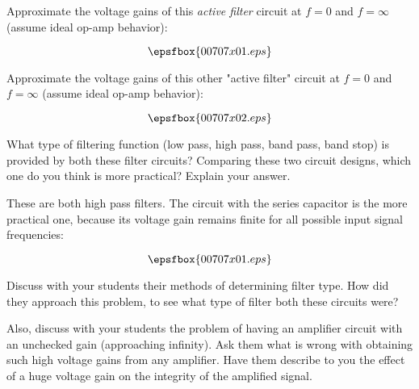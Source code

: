 

Approximate the voltage gains of this {\it active filter} circuit at $f = 0$ and $f = \infty$ (assume ideal op-amp behavior):

$$\epsfbox{00707x01.eps}$$

\vskip 10pt

Approximate the voltage gains of this other "active filter" circuit at $f = 0$ and $f = \infty$ (assume ideal op-amp behavior):

$$\epsfbox{00707x02.eps}$$

\vskip 10pt

What type of filtering function (low pass, high pass, band pass, band stop) is provided by both these filter circuits?  Comparing these two circuit designs, which one do you think is more practical?  Explain your answer.







These are both high pass filters.  The circuit with the series capacitor is the more practical one, because its voltage gain remains finite for all possible input signal frequencies:

$$\epsfbox{00707x01.eps}$$







Discuss with your students their methods of determining filter type.  How did they approach this problem, to see what type of filter both these circuits were?

Also, discuss with your students the problem of having an amplifier circuit with an unchecked gain (approaching infinity).  Ask them what is wrong with obtaining such high voltage gains from any amplifier.  Have them describe to you the effect of a huge voltage gain on the integrity of the amplified signal.




